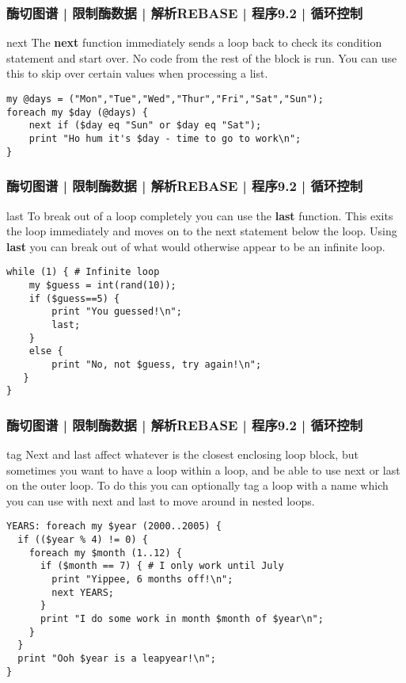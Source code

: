 \begin{frame}[fragile]
  \frametitle{酶切图谱 | 限制酶数据 | 解析REBASE | 程序9.2 | 循环控制}
  \begin{block}{next}
    The \textbf{next} function immediately sends a loop back to check its condition statement and start over. No code from the rest of the block is run. You can use this to skip over certain values when processing a list.
  \end{block}
  \pause
  \vspace{-1.5em}
\begin{lstlisting}
my @days = ("Mon","Tue","Wed","Thur","Fri","Sat","Sun");
foreach my $day (@days) {
    next if ($day eq "Sun" or $day eq "Sat");
    print "Ho hum it's $day - time to go to work\n";
}
\end{lstlisting}
\end{frame}

\begin{frame}[fragile]
  \frametitle{酶切图谱 | 限制酶数据 | 解析REBASE | 程序9.2 | 循环控制}
  \begin{block}{last}
    {\small To break out of a loop completely you can use the \textbf{last} function. This exits the loop immediately and moves on to the next statement below the loop. Using \textbf{last} you can break out of what would otherwise appear to be an infinite loop.}
  \end{block}
  \vspace{-0.5em}
  \pause
  \vspace{-1.5em}
\begin{lstlisting}
while (1) { # Infinite loop
    my $guess = int(rand(10));
    if ($guess==5) {
        print "You guessed!\n";
        last;
    }
    else {
        print "No, not $guess, try again!\n";
   }
}
\end{lstlisting}
\end{frame}

\begin{frame}[fragile]
  \frametitle{酶切图谱 | 限制酶数据 | 解析REBASE | 程序9.2 | 循环控制}
  \begin{block}{tag}
    {\footnotesize Next and last affect whatever is the closest enclosing loop block, but sometimes you want to have a loop within a loop, and be able to use next or last on the outer loop. To do this you can optionally tag a loop with a name which you can use with next and last to move around in nested loops.}
  \end{block}
  \vspace{-1em}
  \pause
  \vspace{-1.3em}
\begin{lstlisting}[basicstyle=\footnotesize\tt,numberstyle=\scriptsize]
YEARS: foreach my $year (2000..2005) {
  if (($year % 4) != 0) {
    foreach my $month (1..12) {
      if ($month == 7) { # I only work until July
        print "Yippee, 6 months off!\n";
        next YEARS;
      }
      print "I do some work in month $month of $year\n";
    }
  }
  print "Ooh $year is a leapyear!\n";
}
\end{lstlisting}
\end{frame}

